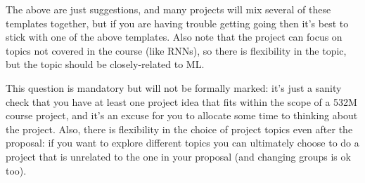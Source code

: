\documentclass{article}
\def\blu#1{{\color{blu}#1}}
\begin{document}
The above are just suggestions, and many projects will mix several of these templates together, but if you are having trouble getting going then it's best to stick with one of the above templates. Also note that the project can focus on topics not covered in the course (like RNNs), so there is flexibility in the topic, but the topic should be closely-related to ML.

\blu{This question is mandatory but will not be formally marked: it's just a sanity check that you have at least one project idea that fits within the scope of a 532M course project, and it's an excuse for you to allocate some time to thinking about the project.} Also, there is flexibility in the choice of project topics even after the proposal: if you want to explore different topics you can ultimately choose to do a project that is unrelated to the one in your proposal (and changing groups is ok too).
\end{document}
